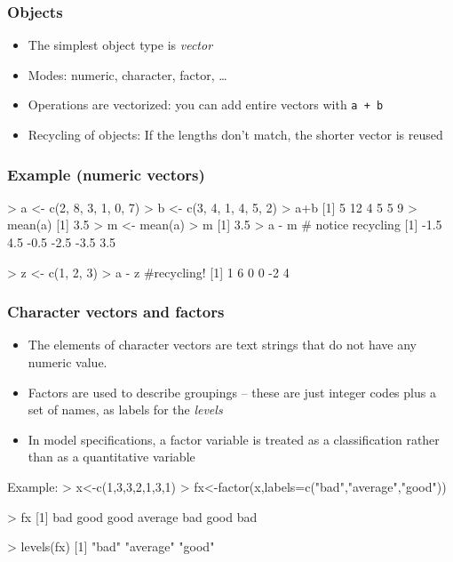 \documentclass[xcolor=svgnames,handout]{beamer}
\newcommand{\code}[1]{\texttt{#1}}
\let\overbatim\verbatim
\let\endoverbatim\endverbatim
\newenvironment{vcode}%
{\bgroup\baselineskip=0.8\baselineskip\overbatim}%
{\endoverbatim\egroup}
\begin{document}
\begin{frame}
  \frametitle{Objects}
  \begin{itemize}
  \item The simplest object type is \emph{vector}
  \item Modes: numeric,  character,  factor, \ldots
  \item Operations are vectorized: you can add entire vectors with
    \code{a + b}
  \item Recycling of objects: If the lengths don't match, the shorter
    vector is reused 
  \end{itemize}
\end{frame}


\begin{frame}[fragile]
\frametitle{Example (numeric vectors)}
\begin{vcode}
> a <- c(2, 8, 3, 1, 0, 7)
> b <- c(3, 4, 1, 4, 5, 2)
> a+b
[1]  5 12  4  5  5  9
> mean(a)
[1] 3.5
> m <- mean(a)
> m
[1] 3.5
> a - m # notice recycling
[1] -1.5  4.5 -0.5 -2.5 -3.5  3.5

> z <- c(1, 2, 3)
> a - z   #recycling!
[1]  1  6  0  0 -2  4
\end{vcode}
\end{frame}


\begin{frame}[fragile]
  \frametitle{Character vectors and factors}
  \begin{itemize}
  \item The elements of character vectors are text strings that do not have any numeric value.  
  \item \alert{Factors} are used to describe groupings -- these are just integer codes plus a set of names, as labels for
    the \emph{levels}
  \item In model specifications, a factor variable is treated as a classification
    rather than as a quantitative variable
  \end{itemize}
 Example: 
\begin{vcode}
> x<-c(1,3,3,2,1,3,1)
> fx<-factor(x,labels=c("bad","average","good"))

> fx
[1] bad     good    good    average bad     good    bad    

 > levels(fx)
[1] "bad"     "average" "good"       
 \end{vcode}     
\end{frame}
\end{document}

